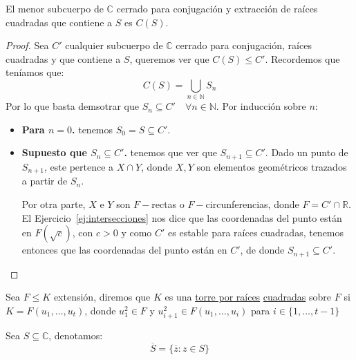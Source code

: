 \begin{teo}
    El menor subcuerpo de $\mathbb{C}$ cerrado para conjugación y extracción de raíces cuadradas que contiene a $S$ es $C(S)$.
    \begin{proof}
        Sea $C'$ cualquier subcuerpo de $\mathbb{C}$ cerrado para conjugación, raíces cuadradas y que contiene a $S$, queremos ver que $C(S)\leq C'$. Recordemos que teníamos que:
        \begin{equation*}
            C(S) = \bigcup_{n\in \mathbb{N}} S_n
        \end{equation*}
        Por lo que basta demsotrar que $S_n\subseteq C' \quad \forall n\in \mathbb{N}$. Por inducción sobre $n$:
        \begin{itemize}
            \item \textbf{Para $n=0$.} tenemos $S_0 = S\subseteq C'$.
            \item \textbf{Supuesto que $S_n\subseteq C'$.} tenemos que ver que $S_{n+1}\subseteq C'$. Dado un punto de $S_{n+1}$, este pertence a $X\cap Y$, donde $X,Y$ son elementos geométricos trazados a partir de $S_n$. 

                Por otra parte, $X$ e $Y$ son $F-$rectas o $F-$circunferencias, donde $F=C'\cap \mathbb{R}$. El Ejercicio~\ref{ej:intersecciones} nos dice que las coordenadas del punto están en $F(\sqrt{c})$, con $c>0$ y como $C'$ es estable para raíces cuadradas, tenemos entonces que las coordenadas del punto están en $C'$, de donde $S_{n+1}\subseteq C'$.
        \end{itemize}
    \end{proof}
\end{teo}

\begin{definicion}
    Sea $F\leq K$ extensión, diremos que $K$ es una \underline{torre por raíces} \underline{cuadradas} sobre $F$ si $K = F(u_1, \ldots, u_t)$, donde $u_1^2 \in F$ y $u_{i+1}^2 \in F(u_1, \ldots, u_i)$ para $i \in \{1,\ldots,t-1\}$
\end{definicion}

\begin{notacion}
    Sea $S\subseteq \mathbb{C}$, denotamos:
    \begin{equation*}
        \overline{S} = \{\overline{z}:z\in S\}
    \end{equation*}
\end{notacion}

